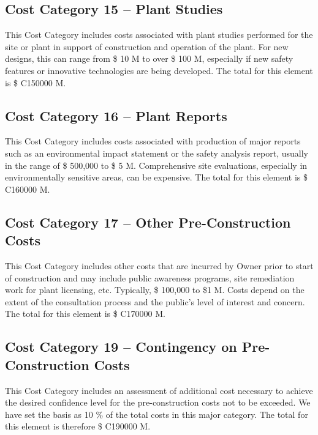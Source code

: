 \subsection*{Cost Category 15 – Plant Studies} 
This Cost Category includes costs associated with plant studies performed for the site or plant in support of construction and operation of the plant. For new designs, this can range from \$ 10 M to over \$ 100 M, especially if new safety features or innovative technologies are being developed.  The total for this element is \$ C150000 M.

\subsection*{Cost Category 16 – Plant Reports} 
This Cost Category includes costs associated with production of major reports such as an environmental impact statement or the safety analysis report, usually in the range of \$ 500,000 to \$ 5 M. Comprehensive site evaluations, especially in environmentally sensitive areas, can be expensive. The total for this element is \$ C160000 M.

\subsection*{Cost Category 17 – Other Pre-Construction Costs} 
This Cost Category includes other costs that are incurred by Owner prior to start of construction and may include public awareness programs, site remediation work for plant licensing, etc. Typically, \$ 100,000 to \$1 M. Costs depend on the extent of the consultation process and the public's level of interest and concern.  The total for this element is \$ C170000 M.

\subsection*{Cost Category 19 – Contingency on Pre-Construction Costs}  
This Cost Category includes an assessment of additional cost necessary to achieve the desired confidence level for the pre-construction costs not
to be exceeded. We have set the basis as 10 \% of the total costs in this major category. The total for this element is therefore \$ C190000 M.




